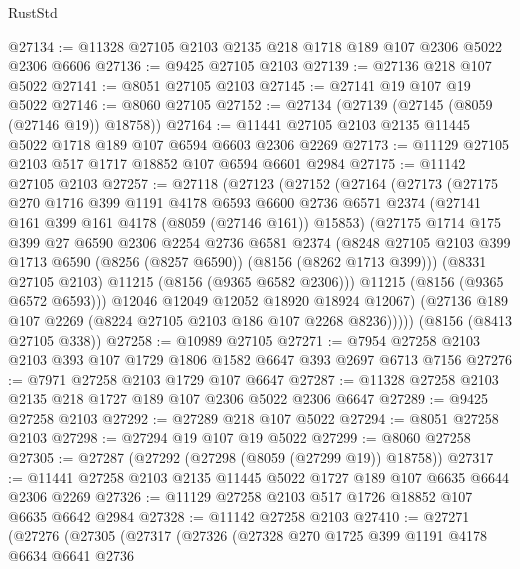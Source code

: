 \begin{lexlean}{RustStd}
\begin{coremodule}
{\begin{coremodule}
{{{{{{{{{{{{{{{{{{{{{{{{{{{{{{{{{{@27134 := @11328 @27105 @2103 @2135 @218 @1718 @189 @107 @2306 @5022 @2306 @6606
@27136 := @9425 @27105 @2103
@27139 := @27136 @218 @107 @5022
@27141 := @8051 @27105 @2103
@27145 := @27141 @19 @107 @19 @5022
@27146 := @8060 @27105
@27152 := @27134 (@27139 (@27145 (@8059 (@27146 @19)) @18758))
@27164 := @11441 @27105 @2103 @2135 @11445 @5022 @1718 @189 @107 @6594 @6603 @2306 @2269
@27173 := @11129 @27105 @2103 @517 @1717 @18852 @107 @6594 @6601 @2984
@27175 := @11142 @27105 @2103
@27257 := @27118
    (@27123
      (@27152
        (@27164
          (@27173
            (@27175
              @270
              @1716
              @399
              @1191
              @4178
              @6593
              @6600
              @2736
              @6571
              @2374
              (@27141 @161 @399 @161 @4178 (@8059 (@27146 @161)) @15853)
              (@27175
                @1714
                @175
                @399
                @27
                @6590
                @2306
                @2254
                @2736
                @6581
                @2374
                (@8248
                  @27105
                  @2103
                  @399
                  @1713
                  @6590
                  (@8256 (@8257 @6590))
                  (@8156 (@8262 @1713 @399)))
                (@8331 @27105 @2103)
                @11215
                (@8156 (@9365 @6582 @2306)))
              @11215
              (@8156 (@9365 @6572 @6593)))
            @12046
            @12049
            @12052
            @18920
            @18924
            @12067)
          (@27136 @189 @107 @2269 (@8224 @27105 @2103 @186 @107 @2268 @8236)))))
    (@8156 (@8413 @27105 @338))
@27258 := @10989 @27105
@27271 := @7954 @27258 @2103 @2103 @393 @107 @1729 @1806 @1582 @6647 @393 @2697 @6713 @7156
@27276 := @7971 @27258 @2103 @1729 @107 @6647
@27287 := @11328 @27258 @2103 @2135 @218 @1727 @189 @107 @2306 @5022 @2306 @6647
@27289 := @9425 @27258 @2103
@27292 := @27289 @218 @107 @5022
@27294 := @8051 @27258 @2103
@27298 := @27294 @19 @107 @19 @5022
@27299 := @8060 @27258
@27305 := @27287 (@27292 (@27298 (@8059 (@27299 @19)) @18758))
@27317 := @11441 @27258 @2103 @2135 @11445 @5022 @1727 @189 @107 @6635 @6644 @2306 @2269
@27326 := @11129 @27258 @2103 @517 @1726 @18852 @107 @6635 @6642 @2984
@27328 := @11142 @27258 @2103
@27410 := @27271
    (@27276
      (@27305
        (@27317
          (@27326
            (@27328
              @270
              @1725
              @399
              @1191
              @4178
              @6634
              @6641
              @2736
}}}}}}}}}}}}}}}}}}}}}}}}}}}}}}}}}}
\end{coremodule}}
\end{coremodule}
\end{lexlean}
